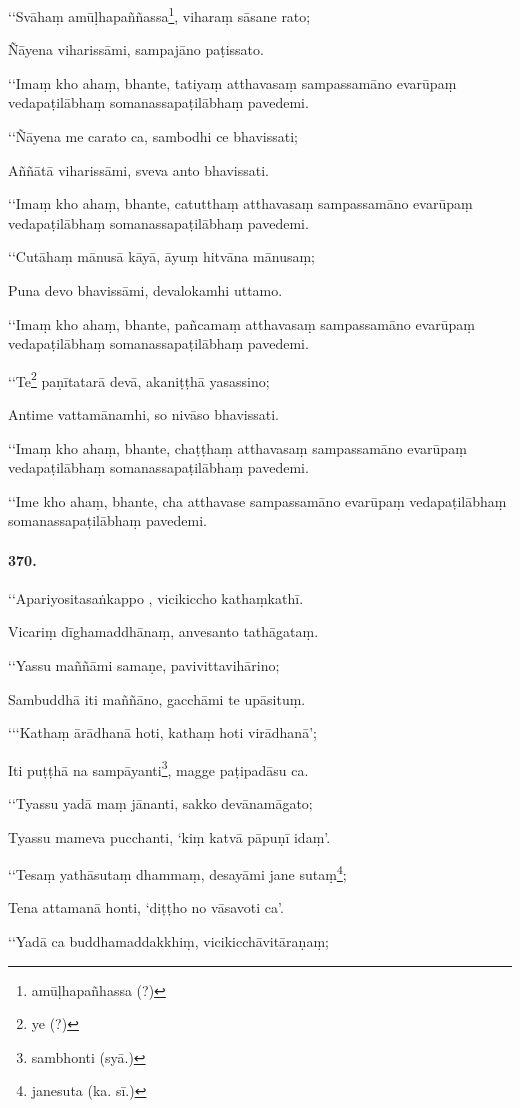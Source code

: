‘‘Svāhaṃ amūḷhapaññassa\footnote{amūḷhapañhassa (?)}, viharaṃ sāsane rato;

Ñāyena viharissāmi, sampajāno paṭissato.

‘‘Imaṃ kho ahaṃ, bhante, tatiyaṃ atthavasaṃ sampassamāno evarūpaṃ vedapaṭilābhaṃ somanassapaṭilābhaṃ pavedemi.

‘‘Ñāyena me carato ca, sambodhi ce bhavissati;

Aññātā viharissāmi, sveva anto bhavissati.

‘‘Imaṃ kho ahaṃ, bhante, catutthaṃ atthavasaṃ sampassamāno evarūpaṃ vedapaṭilābhaṃ somanassapaṭilābhaṃ pavedemi.

‘‘Cutāhaṃ mānusā kāyā, āyuṃ hitvāna mānusaṃ;

Puna devo bhavissāmi, devalokamhi uttamo.

‘‘Imaṃ kho ahaṃ, bhante, pañcamaṃ atthavasaṃ sampassamāno evarūpaṃ vedapaṭilābhaṃ somanassapaṭilābhaṃ pavedemi.

‘‘Te\footnote{ye (?)} paṇītatarā devā, akaniṭṭhā yasassino;

Antime vattamānamhi, so nivāso bhavissati.

‘‘Imaṃ kho ahaṃ, bhante, chaṭṭhaṃ atthavasaṃ sampassamāno evarūpaṃ vedapaṭilābhaṃ somanassapaṭilābhaṃ pavedemi.

‘‘Ime kho ahaṃ, bhante, cha atthavase sampassamāno evarūpaṃ vedapaṭilābhaṃ somanassapaṭilābhaṃ pavedemi.

\paragraph{370.}‘‘Apariyositasaṅkappo , vicikiccho kathaṃkathī.

Vicariṃ dīghamaddhānaṃ, anvesanto tathāgataṃ.

‘‘Yassu maññāmi samaṇe, pavivittavihārino;

Sambuddhā iti maññāno, gacchāmi te upāsituṃ.

‘‘‘Kathaṃ ārādhanā hoti, kathaṃ hoti virādhanā’;

Iti puṭṭhā na sampāyanti\footnote{sambhonti (syā.)}, magge paṭipadāsu ca.

‘‘Tyassu yadā maṃ jānanti, sakko devānamāgato;

Tyassu mameva pucchanti, ‘kiṃ katvā pāpuṇī idaṃ’.

‘‘Tesaṃ yathāsutaṃ dhammaṃ, desayāmi jane sutaṃ\footnote{janesuta (ka. sī.)};

Tena attamanā honti, ‘diṭṭho no vāsavoti ca’.

‘‘Yadā ca buddhamaddakkhiṃ, vicikicchāvitāraṇaṃ;


